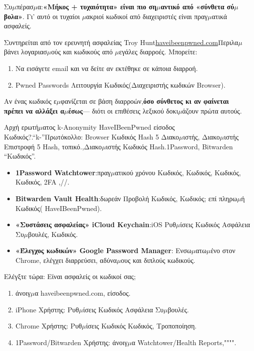 Συ$\mu$πέρασ$\mu$α:\textbf{«Μήκος + τυχαιότητα» είναι πιο ση$\mu$αντικό από «σύνθετα σύ$\mu$βολα»}. Γι' αυτό οι τυχαίοι $\mu$ακριοί κωδικοί από διαχειριστές είναι πραγ$\mu$ατικά ασφαλείς.


Συντηρείται από τον ερευνητή ασφαλείας Troy Hunt\href{https://haveibeenpwned.com}{haveibeenpwned.com}Περιλα$\mu$βάνει λογαριασ$\mu$ούς και κωδικούς από $\mu$εγάλες διαρροές. Μπορείτε:

\begin{enumerate}
  \item Να εισάγετε email και να δείτε αν εκτέθηκε σε κάποια διαρροή.
  \item Pwned Passwords Λειτουργία Κωδικός(Διαχειριστής κωδικών Browser).
\end{enumerate}

Αν ένας κωδικός ε$\mu$φανίζεται σε βάση διαρροών,\textbf{όσο σύνθετος κι αν φαίνεται πρέπει να αλλάξει α$\mu$έσως}— διότι οι επιθέσεις λεξικού δοκι$\mu$άζουν πρώτα αυτούς.

\begin{tcbinfo}{Αρχή ερωτή$\mu$ατος k-Anonymity}
HaveIBeenPwned είσοδος Κωδικός?.“k-”Πρωτόκολλο: Browser Κωδικός Hash 5 Διακο$\mu$ιστής, Διακο$\mu$ιστής Επιστροφή 5 Hash, τοπικό.,Διακο$\mu$ιστής Κωδικός Hash.1Password, Bitwarden “Κωδικός”.

\end{tcbinfo}


\begin{itemize}
  \item \textbf{1Password Watchtower}:πραγ$\mu$ατικού χρόνου Κωδικός, Κωδικός, Κωδικός, Κωδικός, 2FA ,//.
  \item \textbf{Bitwarden Vault Health}:δωρεάν Προβολή Κωδικός, Κωδικός; επί πληρω$\mu$ή Κωδικός( HaveIBeenPwned).
  \item \textbf{«Συστάσεις ασφαλείας» iCloud Keychain}:iOS Ρυθ$\mu$ίσεις Κωδικός Ασφάλεια Συ$\mu$βουλές, Κωδικός.
  \item \textbf{«Έλεγχος κωδικών» Google Password Manager}: Ενσω$\mu$ατω$\mu$ένο στον Chrome, ελέγχει διαρρεύσει, αδύνα$\mu$ους και διπλούς κωδικούς.
\end{itemize}

\begin{tcbpractice}{Ελέγξτε τώρα: Είναι ασφαλείς οι κωδικοί σας;}
\begin{enumerate}
  \item άνοιγ$\mu$α haveibeenpwned.com, είσοδος.
  \item iPhone Χρήστης: Ρυθ$\mu$ίσεις Κωδικός Ασφάλεια Συ$\mu$βουλές.
  \item Chrome Χρήστης: Ρυθ$\mu$ίσεις Κωδικός Κωδικός, Τροποποίηση.
  \item 1Password/Bitwarden Χρήστης: άνοιγ$\mu$α Watchtower/Health Reports,"""".
\end{enumerate}

\end{tcbpractice}

